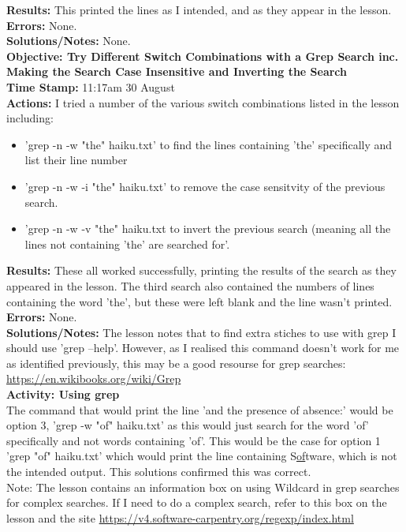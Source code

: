 \documentclass{article}
\begin{document}
\begin{FlushLeft}
\textbf{Results:} This printed the lines as I intended, and as they appear in the lesson.\\
\textbf{Errors:} None.\\
\textbf{Solutions/Notes:} None. \\
\vspace{5mm}
\textbf{Objective: Try Different Switch Combinations with a Grep Search inc. Making the Search Case Insensitive and Inverting the Search}\\ 
\textbf{Time Stamp:} 11:17am 30 August\\
\textbf{Actions:} I tried a number of the various switch combinations listed in the lesson including:
\begin{itemize}
    \item 'grep -n -w "the" haiku.txt' to find the lines containing 'the' specifically and list their line number
    \item 'grep -n -w -i "the" haiku.txt' to remove the case sensitvity of the previous search.
    \item 'grep -n -w -v "the" haiku.txt to invert the previous search (meaning all the lines not containing 'the' are searched for'.
\end{itemize}
\textbf{Results:} These all worked successfully, printing the results of the search as they appeared in the lesson. The third search also contained the numbers of lines containing the word 'the', but these were left blank and the line wasn't printed.\\
\textbf{Errors:} None.\\
\textbf{Solutions/Notes:} The lesson notes that to find extra stiches to use with grep I should use 'grep --help'. However, as I realised this command doesn't work for me as identified previously, this may be a good resourse for grep searches: \url{https://en.wikibooks.org/wiki/Grep}\\
\vspace{5mm}
\textbf{Activity: Using grep} \\
The command that would print the line 'and the presence of absence:' would be option 3, 'grep -w "of" haiku.txt' as this would just search for the word 'of' specifically and not words containing 'of'. This would be the case for option 1 'grep "of" haiku.txt' which would print the line containing S\underline{of}tware, which is not the intended output. This solutions confirmed this was correct.\\
\vspace{5mm}
Note: The lesson contains an information box on using Wildcard in grep searches for complex searches. If I need to do a complex search, refer to this box on the lesson and the site \url{https://v4.software-carpentry.org/regexp/index.html}\\

\end{FlushLeft}
\end{document}

